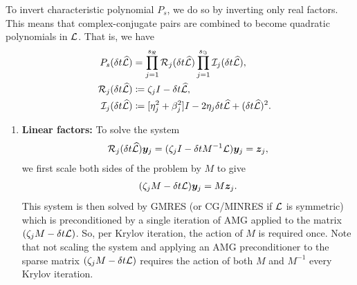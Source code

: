 \documentclass[review]{siamart}
\begin{document}
To invert characteristic polynomial $P_s$, we do so by inverting only real factors. This means that complex-conjugate pairs are combined to become quadratic polynomials in ${\cal L}$. That is, we have
\begin{align} 
P_s (\delta t \widehat{\cal L}) 
&= 
\prod \limits_{j = 1}^{s_{\Re}} {\cal R}_j(\delta t \widehat{\cal L}) \prod \limits_{j = 1}^{s_{\Im}} {\cal I}_j(\delta t \widehat{\cal L}),\\
\quad 
{\cal R}_j(\delta t \widehat{\cal L}) 
&\coloneqq 
\zeta_j I - \delta t \widehat{\cal L}, \\
{\cal I}_j(\delta t \widehat{\cal L})
&\coloneqq
[\eta_j^2 + \beta_j^2] I - 2 \eta_j \delta t \widehat{\cal L} + (\delta t \widehat{\cal L})^2.
\end{align}
\begin{enumerate}
\item \textbf{Linear factors:} To solve the system 
\begin{align}
{\cal R}_j(\delta t \widehat{\cal L}) \bm{y}_j = (\zeta_j I -  \delta t M^{-1} {\cal L}) \bm{y}_j = \bm{z}_j,
\end{align}
we first scale both sides of the problem by ${M}$ to give
\begin{align}
(\zeta_j M -  \delta t {\cal L}) \bm{y}_j = M \bm{z}_j.
\end{align}
This system is then solved by GMRES (or CG/MINRES if ${\cal L}$ is symmetric) which is preconditioned by a single iteration of AMG applied to the matrix $(\zeta_j M -  \delta t {\cal L})$. So, per Krylov iteration, the action of $M$ is required once. Note that not scaling the system and applying an AMG preconditioner to the sparse matrix $(\zeta_j M -  \delta t {\cal L})$ requires the action of both $M$ and $M^{-1}$ every Krylov iteration.


\end{enumerate}
\end{document}
